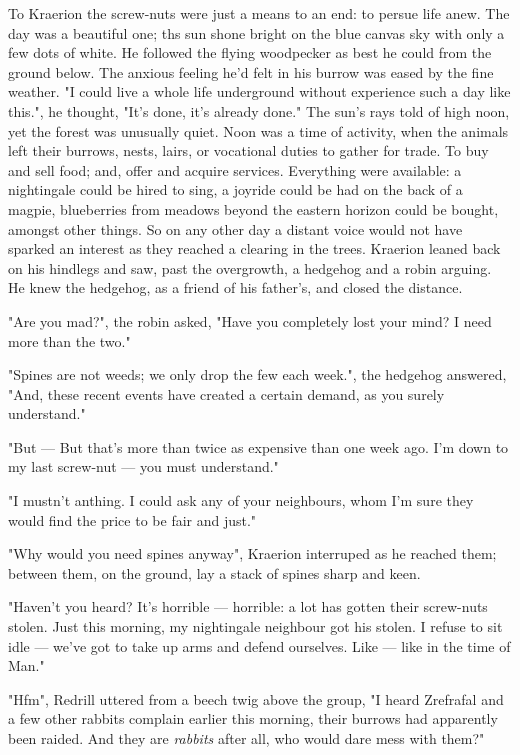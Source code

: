 To Kraerion the screw-nuts were just a means to an end: to persue life anew. The day was a beautiful one; ths sun shone bright on the blue canvas sky with only a few dots of white. He followed the flying woodpecker as best he could from the ground below. The anxious feeling he'd felt in his burrow was eased by the fine weather.
  "I could live a whole life underground without experience such a day like this.", he thought, "It's done, it's already done."
The sun's rays told of high noon, yet the forest was unusually quiet. Noon was a time of activity, when the animals left their burrows, nests, lairs, or vocational duties to gather for trade. To buy and sell food; and, offer and acquire services. Everything were available: a nightingale could be hired to sing, a joyride could be had on the back of a magpie, blueberries from meadows beyond the eastern horizon could be bought, amongst other things.
  So on any other day a distant voice would not have sparked an interest as they reached a clearing in the trees. Kraerion leaned back on his hindlegs and saw, past the overgrowth, a hedgehog and a robin arguing. He knew the hedgehog, as a friend of his father's, and closed the distance.

"Are you mad?", the robin asked, "Have you completely lost your mind? I need more than the two."

"Spines are not weeds; we only drop the few each week.", the hedgehog answered, "And, these recent events have created a certain demand, as you surely understand."

"But — But that's more than twice as expensive than one week ago. I'm down to my last screw-nut — you must understand."

"I mustn't anthing. I could ask any of your neighbours, whom I'm sure they would find the price to be fair and just."

"Why would you need spines anyway", Kraerion interruped as he reached them; between them, on the ground, lay a stack of spines sharp and keen.

"Haven't you heard? It's horrible — horrible: a lot has gotten their screw-nuts stolen. Just this morning, my nightingale neighbour got his stolen. I refuse to sit idle — we've got to take up arms and defend ourselves. Like — like in the time of Man."

"Hfm", Redrill uttered from a beech twig above the group, "I heard Zrefrafal and a few other rabbits complain earlier this morning, their burrows had apparently been raided. And they are {\it rabbits} after all, who would dare mess with them?"

